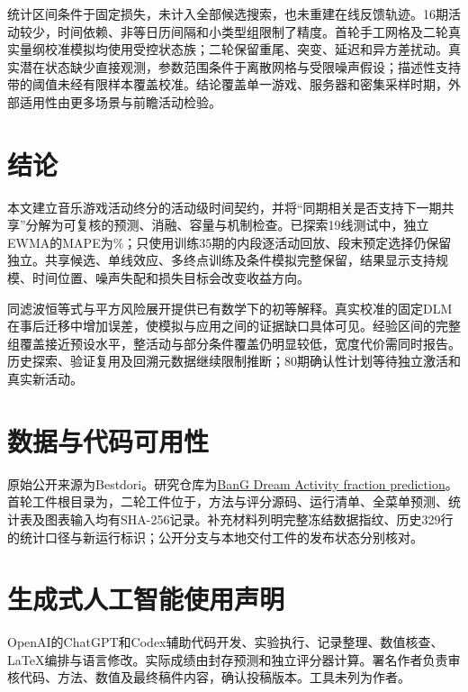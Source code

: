 \documentclass[preprint,12pt]{elsarticle}
\begin{document}
统计区间条件于固定损失，未计入全部候选搜索，也未重建在线反馈轨迹。16期活动较少，时间依赖、非等日历间隔和小类型组限制了精度。首轮手工网格及二轮真实量纲校准模拟均使用受控状态族；二轮保留重尾、突变、延迟和异方差扰动。真实潜在状态缺少直接观测，参数范围条件于离散网格与受限噪声假设；描述性支持带的阈值未经有限样本覆盖校准。结论覆盖单一游戏、服务器和密集采样时期，外部适用性由更多场景与前瞻活动检验。

\section{结论}
本文建立音乐游戏活动终分的活动级时间契约，并将“同期相关是否支持下一期共享”分解为可复核的预测、消融、容量与机制检查。已探索19线测试中，独立EWMA的MAPE为\EwmaTest\%；只使用训练35期的内段逐活动回放、段末预定选择仍保留独立。共享候选、单线效应、多终点训练及条件模拟完整保留，结果显示支持规模、时间位置、噪声失配和损失目标会改变收益方向。

同滤波恒等式与平方风险展开提供已有数学下的初等解释。真实校准的固定DLM在事后迁移中增加误差，使模拟与应用之间的证据缺口具体可见。经验区间的完整组覆盖接近预设水平，整活动与部分条件覆盖仍明显较低，宽度代价需同时报告。历史探索、验证复用及回溯元数据继续限制推断；80期确认性计划等待独立激活和真实新活动。

\FloatBarrier
\section*{数据与代码可用性}
原始公开来源为Bestdori\citep{bestdori2026data}。研究仓库为\href{https://github.com/AhsokaTano26/BanG-DreamActivity-fraction-prediction/tree/research/innovation-20261113}{BanG Dream Activity fraction prediction}。首轮工件根目录为，二轮工件位于，方法与评分源码、运行清单、全菜单预测、统计表及图表输入均有SHA-256记录。补充材料列明完整冻结数据指纹、历史329行的统计口径与新运行标识；公开分支与本地交付工件的发布状态分别核对。

\section*{生成式人工智能使用声明}
OpenAI的ChatGPT和Codex辅助代码开发、实验执行、记录整理、数值核查、LaTeX编排与语言修改。实际成绩由封存预测和独立评分器计算。署名作者负责审核代码、方法、数值及最终稿件内容，确认投稿版本。工具未列为作者。

\clearpage
\appendix
\newcommand{\PaperMainDocument}{}

\FloatBarrier
\begingroup\raggedright\small


\endgroup
\end{document}
